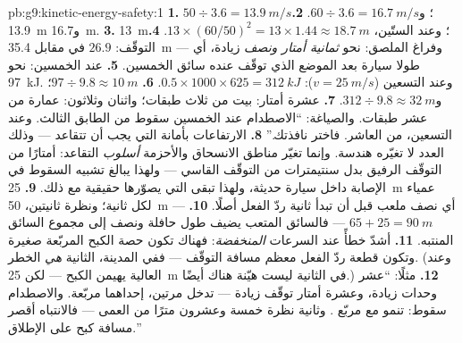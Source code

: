 \begin{solution}{pb:g9:kinetic-energy-safety:1}
\textbf{1.} $50 \div 3.6 = \qty{13.9}{m/s}$؛ و$60 \div 3.6 =
\qty{16.7}{m/s}$.
\textbf{2.} \qty{13.9}{m} و\qty{16.7}{m}.
\textbf{3.} \qty{13}{m}؛ وعند الستّين، $13 \times (60/50)^2 =
13 \times 1.44 \approx \qty{18.7}{m}$.
\textbf{4.} التوقّف: $26.9$ في مقابل \qty{35.4}{m} --- وفراغ
الملصق: نحو \emph{ثمانية أمتار ونصف} زيادة، أي طولا سيارة بعد
الموضع الذي توقّف عنده سائق الخمسين.
\textbf{5.} عند الخمسين: نحو \qty{97}{kJ}. وعند التسعين
($v = \qty{25}{m/s}$): $0.5 \times 1000 \times 625 =
\qty{312}{kJ}$.
\textbf{6.} $97 \div 9.8 \approx \qty{10}{m}$؛ و$312 \div 9.8
\approx \qty{32}{m}$.
\textbf{7.} عشرة أمتار: بيت من ثلاث طبقات؛ واثنان وثلاثون:
عمارة من عشر طبقات. والصياغة: ``الاصطدام عند الخمسين سقوط من
الطابق الثالث. وعند التسعين، من العاشر. فاختر نافذتك.''
\textbf{8.} الارتفاعات  بأمانة  التي يجب أن تتقاعد
--- وذلك العدد لا تغيّره هندسة. وإنما تغيّر مناطق الانسحاق
والأحزمة \emph{أسلوب} التقاعد: أمتارًا من التوقّف الرفيق بدل
سنتيمترات من التوقّف القاسي --- ولهذا يبالغ تشبيه السقوط في
الإصابة داخل سيارة حديثة، ولهذا تبقى  التي يصوّرها
حقيقية مع ذلك.
\textbf{9.} \qty{25}{m} عمياء لكل ثانية؛ ونظرة ثانيتين،
\qty{50}{m} --- أي نصف ملعب قبل أن تبدأ ثانية ردّ الفعل
أصلًا.
\textbf{10.} $65 + 25 = \qty{90}{m}$ --- فالسائق المتعب يضيف
طول حافلة ونصف إلى مجموع السائق المنتبه.
\textbf{11.} أشدّ خطأً عند السرعات \emph{المنخفضة}: فهناك
تكون حصة الكبح المربّعة صغيرة وتكون قطعة ردّ الفعل معظم مسافة
التوقّف --- ففي المدينة، الثانية \emph{هي} الخطر. (وعند
 العالية يهيمن الكبح --- لكن \qty{25}{m} في الثانية
ليست هيّنة هناك أيضًا.)
\textbf{12.} مثلًا: ``عشر وحدات  زيادة، وعشرة أمتار توقّف
زيادة ---  تدخل مرتين، إحداهما مربّعة. والاصطدام سقوط:
 تنمو مع مربّع . وثانية نظرة خمسة وعشرون مترًا
من العمى --- فالانتباه أقصر مسافة كبح على الإطلاق.''
\end{solution}
